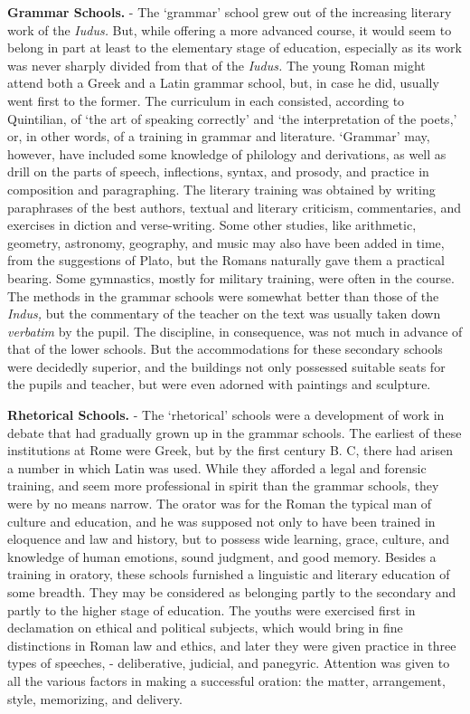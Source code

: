 \documentclass[]{book}
\begin{document}
\textbf{Grammar Schools.} - The `grammar' school grew out of the increasing literary work of the \emph{Iudus.} But, while offering a more advanced course, it would seem to belong in part at least to the elementary stage of education, especially as its work was never sharply divided from that of the \emph{Iudus.} The young Roman might attend both a Greek and a Latin grammar school, but, in case he did, usually went first to the former. The curriculum in each consisted, according to Quintilian, of `the art of speaking correctly' and `the interpretation of the poets,' or, in other words, of a training in grammar and literature. `Grammar' may, however, have included some knowledge of philology and derivations, as well as drill on the parts of speech, inflections, syntax, and prosody, and practice in composition and paragraphing. The literary training was obtained by writing paraphrases of the best authors, textual and literary criticism, commentaries, and exercises in diction and verse-writing. Some other studies, like arithmetic, geometry, astronomy, geography, and music may also have been added in time, from the suggestions of Plato, but the Romans naturally gave them a practical bearing. Some gymnastics, mostly for military training, were often in the course. The methods in the grammar schools were somewhat better than those of the \emph{Indus,} but the commentary of the teacher on the text was usually taken down \emph{verbatim} by the pupil. The discipline, in consequence, was not much in advance of that of the lower schools. But the accommodations for these secondary schools were decidedly superior, and the buildings not only possessed suitable seats for the pupils and teacher, but were even adorned with paintings and sculpture.

\textbf{Rhetorical Schools.} - The `rhetorical' schools were a development of work in debate that had gradually grown up in the grammar schools. The earliest of these institutions at Rome were Greek, but by the first century B. C, there had arisen a number in which Latin was used. While they afforded a legal and forensic training, and seem more professional in spirit than the grammar schools, they were by no means narrow. The orator was for the Roman the typical man of culture and education, and he was supposed not only to have been trained in eloquence and law and history, but to possess wide learning, grace, culture, and knowledge of human emotions, sound judgment, and good memory. Besides a training in oratory, these schools furnished a linguistic and literary education of some breadth. They may be considered as belonging partly to the secondary and partly to the higher stage of education. The youths were exercised first in declamation on ethical and political subjects, which would bring in fine distinctions in Roman law and ethics, and later they were given practice in three types of speeches, - deliberative, judicial, and panegyric. Attention was given to all the various factors in making a successful oration: the matter, arrangement, style, memorizing, and delivery.
\end{document}
